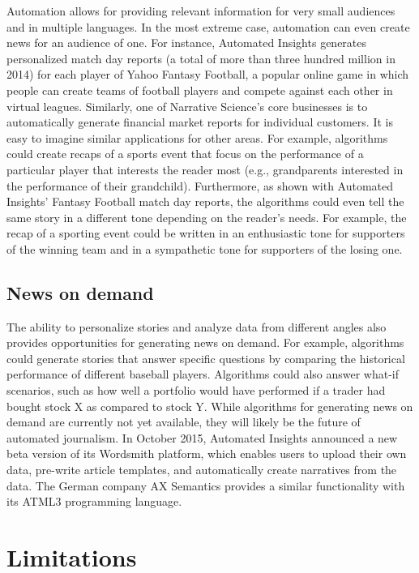 \documentclass[notoc, symmetric, nobib, nols]{towcenter-guideto-book}
\begin{document}
Automation allows for providing relevant information for very small audiences and in multiple languages. In the most extreme case, automation can even create news for an audience of one. For instance, Automated Insights generates personalized match day reports (a total of more than three hundred million in 2014) for each player of Yahoo Fantasy Football, a popular online game in which people can create teams of football players and compete against each other in virtual leagues. Similarly, one of Narrative Science's core businesses is to automatically generate financial market reports for individual customers. It is easy to imagine similar applications for other areas. For example, algorithms could create recaps of a sports event that focus on the performance of a particular player that interests the reader most (e.g., grandparents interested in the performance of their grandchild). Furthermore, as shown with Automated Insights' Fantasy Football match day reports, the algorithms could even tell the same story in a different tone depending on the reader's needs. For example, the recap of a sporting event could be written in an enthusiastic tone for supporters of the winning team and in a sympathetic tone for supporters of the losing one.

\subsection{News on demand}

The ability to personalize stories and analyze data from different angles also provides opportunities for generating news on demand. For example, algorithms could generate stories that answer specific questions by comparing the historical performance of different baseball players. Algorithms could also answer what-if scenarios, such as how well a portfolio would have performed if a trader had bought stock X as compared to stock Y. While algorithms for generating news on demand are currently not yet available, they will likely be the future of automated journalism. In October 2015, Automated Insights announced a new beta version of its Wordsmith platform, which enables users to upload their own data, pre-write article templates, and automatically create narratives from the data.\autocite{kot15} The German company AX Semantics provides a similar functionality with its ATML3 programming language.

\section{Limitations} 
\end{document}

